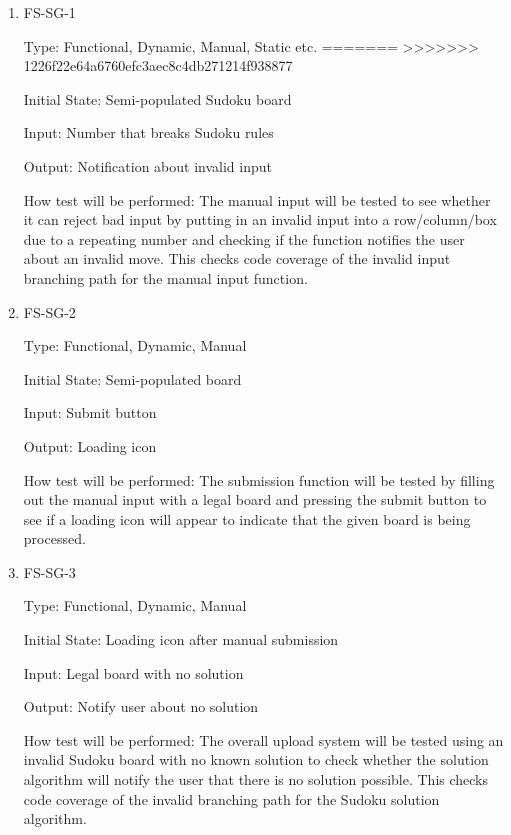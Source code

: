 \documentclass[11pt]{article}
\begin{document}
\begin{enumerate}

\item{FS-SG-1\\}

Type: Functional, Dynamic, Manual, Static etc.
=======
>>>>>>> 1226f22e64a6760efc3aec8c4db271214f938877
					
Initial State: Semi-populated Sudoku board
					
Input: Number that breaks Sudoku rules
					
Output: Notification about invalid input
					
How test will be performed: The manual input will be tested to see whether it can reject bad input by putting in an invalid input into a row/column/box due to a repeating number and checking if the function notifies the user about an invalid move. This checks code coverage of the invalid input branching path for the manual input function.
					
\item{FS-SG-2\\}

Type: Functional, Dynamic, Manual
					
Initial State: Semi-populated board
					
Input: Submit button
					
Output: Loading icon
					
How test will be performed: The submission function will be tested by filling out the manual input with a legal board and pressing the submit button to see if a loading icon will appear to indicate that the given board is being processed.

\item{FS-SG-3\\}

Type: Functional, Dynamic, Manual
					
Initial State: Loading icon after manual submission
					
Input: Legal board with no solution
					
Output: Notify user about no solution
					
How test will be performed: The overall upload system will be tested using an invalid Sudoku board with no known solution to check whether the solution algorithm will notify the user that there is no solution possible. This checks code coverage of the invalid branching path for the Sudoku solution algorithm.

\end{enumerate}
\end{document}
